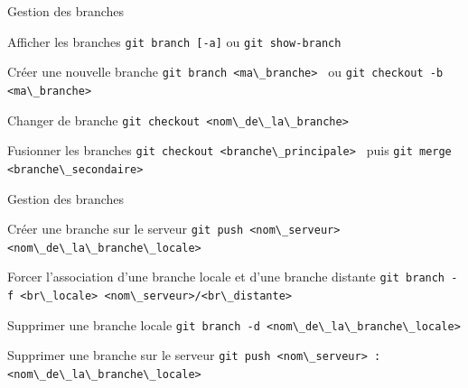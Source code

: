\documentclass{beamer}
\begin{document}
\begin{frame}[fragile]{Gestion des branches}
  \begin{block}{Afficher les branches}
    \textcolor{commandcolor}{\verb?git branch [-a]?}\linebreak
    ou \textcolor{commandcolor}{\verb?git show-branch?}
  \end{block}
  \begin{block}{Créer une nouvelle branche}
    \textcolor{commandcolor}{\verb?git branch <ma\_branche> ?}\linebreak
    ou \textcolor{commandcolor}{\verb?git checkout -b <ma\_branche> ?}
  \end{block}
  \begin{block}{Changer de branche}
    \textcolor{commandcolor}{\verb?git checkout <nom\_de\_la\_branche> ?}
  \end{block}
  \begin{block}{Fusionner les branches}
    \textcolor{commandcolor}{\verb?git checkout <branche\_principale> ?}\linebreak
    puis \textcolor{commandcolor}{\verb?git merge <branche\_secondaire> ?}
  \end{block}
\end{frame}

\begin{frame}[fragile]{Gestion des branches}
  \begin{block}{Créer une branche sur le serveur}
    \textcolor{commandcolor}{\verb?git push <nom\_serveur> <nom\_de\_la\_branche\_locale>?}
  \end{block}
  \begin{block}{Forcer l'association d'une branche locale et d'une branche distante}
    \textcolor{commandcolor}{\verb?git branch -f <br\_locale> <nom\_serveur>/<br\_distante>?}
  \end{block}
  \begin{block}{Supprimer une branche locale}
    \textcolor{commandcolor}{\verb?git branch -d <nom\_de\_la\_branche\_locale>?}
  \end{block}
  \begin{block}{Supprimer une branche sur le serveur}
    \textcolor{commandcolor}{\verb?git push <nom\_serveur> :<nom\_de\_la\_branche\_locale>?}
  \end{block}
\end{frame}
\end{document}
